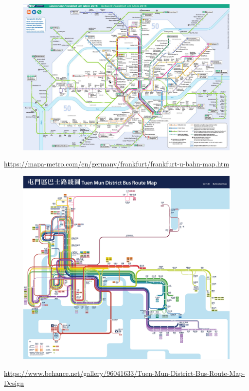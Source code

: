 \documentclass[aspectratio=169]{beamer}
\begin{document}
\begin{frame}
	
	\begin{figure}
		\centering
		\includegraphics[width=0.86\linewidth]{images/frankfurt.jpg}
	\end{figure}
	
	\tiny \url{https://mapa-metro.com/en/germany/frankfurt/frankfurt-u-bahn-map.htm}
	
\end{frame}



\begin{frame}
	
	\begin{figure}
		\centering
		\includegraphics[width=0.68\linewidth]{images/hong_kong_bus.jpg}
	\end{figure}
	
	\tiny \url{https://www.behance.net/gallery/96041633/Tuen-Mun-District-Bus-Route-Map-Design}
	
\end{frame}
\end{document}
